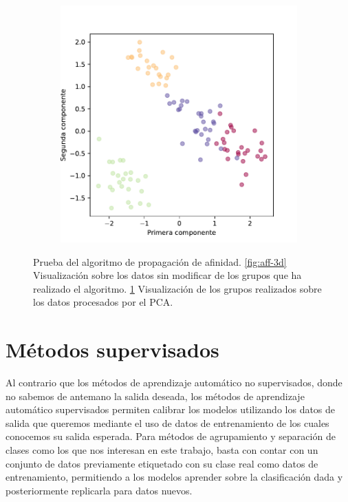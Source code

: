 \begin{figure}[h]
\begin{subfigure}{0.45\textwidth}
    \includegraphics[width=\textwidth]{figures/affinity-pca.pdf}
    \caption{}
    \label{fig:aff-pca}
  \end{subfigure}
  \caption[Prueba del algoritmo de propagación de afinidad.]{Prueba del algoritmo de propagación de afinidad. \ref{fig:aff-3d} Visualización sobre los datos sin modificar de los grupos que ha realizado el algoritmo. \ref{fig:aff-pca} Visualización de los grupos realizados sobre los datos procesados por el PCA.}
  \label{fig:aff}
\end{figure}

\newpage
\section{Métodos supervisados}
\label{sec:supervised}

Al contrario que los métodos de aprendizaje automático no supervisados, donde no sabemos de antemano la salida deseada, los métodos de aprendizaje automático supervisados permiten calibrar los modelos utilizando los datos de salida que queremos mediante el uso de datos de entrenamiento de los cuales conocemos su salida esperada. Para métodos de agrupamiento y separación de clases como los que nos interesan en este trabajo, basta con contar con un conjunto de datos previamente etiquetado con su clase real como datos de entrenamiento, permitiendo a los modelos aprender sobre la clasificación dada y posteriormente replicarla para datos nuevos.

